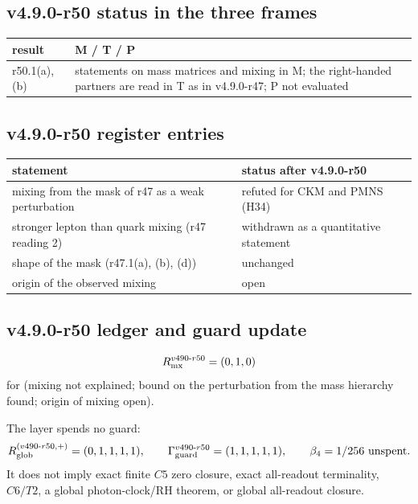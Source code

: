 \subsection*{v4.9.0-r50 status in the three frames}
\label{subsec:v490-r50-frames}

\begin{center}
\small
\begin{tabular}{@{}>{\raggedright\arraybackslash}p{}>{\raggedright\arraybackslash}p{}@{}}
\toprule
result & M / T / P\\
\midrule
r50.1(a), (b) & statements on mass matrices and mixing in M; the right-handed partners are read in T as in v4.9.0-r47; P not evaluated\\
\bottomrule
\end{tabular}
\end{center}

\subsection*{v4.9.0-r50 register entries}
\label{subsec:v490-r50-register}

\begin{center}
\small
\begin{tabular}{@{}>{\raggedright\arraybackslash}p{}>{\raggedright\arraybackslash}p{}@{}}
\toprule
statement & status after v4.9.0-r50\\
\midrule
mixing from the mask of r47 as a weak perturbation & refuted for CKM and PMNS (H34)\\
stronger lepton than quark mixing (r47 reading 2) & withdrawn as a quantitative statement\\
shape of the mask (r47.1(a), (b), (d)) & unchanged\\
origin of the observed mixing & open\\
\bottomrule
\end{tabular}
\end{center}

\subsection*{v4.9.0-r50 ledger and guard update}
\label{subsec:v490-r50-ledger-guard}

\[
R_{\rm mx}^{v490\text{-}r50}=(0,1,0)
\]
for (mixing not explained; bound on the perturbation from the mass hierarchy found; origin of mixing open).

The layer spends no guard:
\[
R_{\rm glob}^{(v490\text{-}r50,+)}=(0,1,1,1,1),
\qquad
\Gamma_{\rm guard}^{v490\text{-}r50}=(1,1,1,1,1),
\qquad
\beta_4=1/256\ \text{unspent}.
\]
It does not imply exact finite \(C5\) zero closure, exact all-readout terminality,
\(C6/T2\), a global photon-clock/RH theorem, or global all-readout closure.
